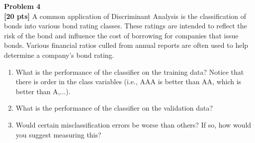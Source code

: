 \documentclass{article}
\newenvironment{problem}[2][Problem]
    { \begin{mdframed}[backgroundcolor=gray!20] \textbf{#1 #2} \\}
    {  \end{mdframed}}
\begin{document}
\newpage
\begin{problem}{4}
\textbf{[20 pts]}
A common application of Discriminant Analysis is the classification of bonds into various bond rating classes. These ratings are intended to reflect the risk of the bond and influence the cost of borrowing for companies that issue bonds. Various financial ratios culled from annual reports are often used to help determine a company’s bond rating.
\begin{enumerate}
	\item What is the performance of the classifier on the training data? Notice that there is order in the class variables (i.e., AAA is better than AA, which is better than A,...).
	\item What is the performance of the classifier on the validation data?
	\item Would certain misclassification errors be worse than others? If so, how would you
suggest measuring this?
\end{enumerate}
\end{problem}
\end{document}
